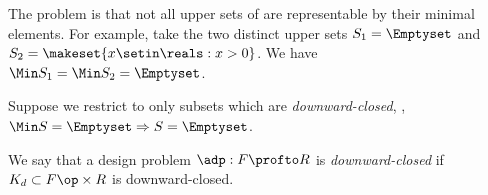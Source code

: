 The problem is that not all upper sets of \posA are representable by their minimal elements.
For example, take the two distinct upper sets $S_1 = \Emptyset$ and $S_2 = \makeset{x \setin \reals : x > 0}$.
We have $\Min S_1 = \Min S_2 = \Emptyset$.

Suppose we restrict to only subsets which are \emph{downward-closed}, \ie,  $\Min S = \Emptyset \Rightarrow S = \Emptyset$.





We say that a design problem $\adp : F \profto R$ is \emph{downward-closed} if $K_d \subset F\op \times R$ is downward-closed.


